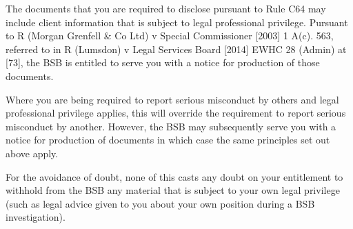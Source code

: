 The documents that you are required to disclose pursuant to Rule C64 may
include client information that is subject to legal professional
privilege. Pursuant to R (Morgan Grenfell \& Co Ltd) v Special
Commissioner {[}2003{]} 1 A(c). 563, referred to in R (Lumsdon) v Legal
Services Board {[}2014{]} EWHC 28 (Admin) at {[}73{]}, the BSB is
entitled to serve you with a notice for production of those documents.

Where you are being required to report serious misconduct by others and
legal professional privilege applies, this will override the requirement
to report serious misconduct by another. However, the BSB may
subsequently serve you with a notice for production of documents in
which case the same principles set out above apply.

For the avoidance of doubt, none of this casts any doubt on your
entitlement to withhold from the BSB any material that is subject to
your own legal privilege (such as legal advice given to you about your
own position during a BSB investigation).




